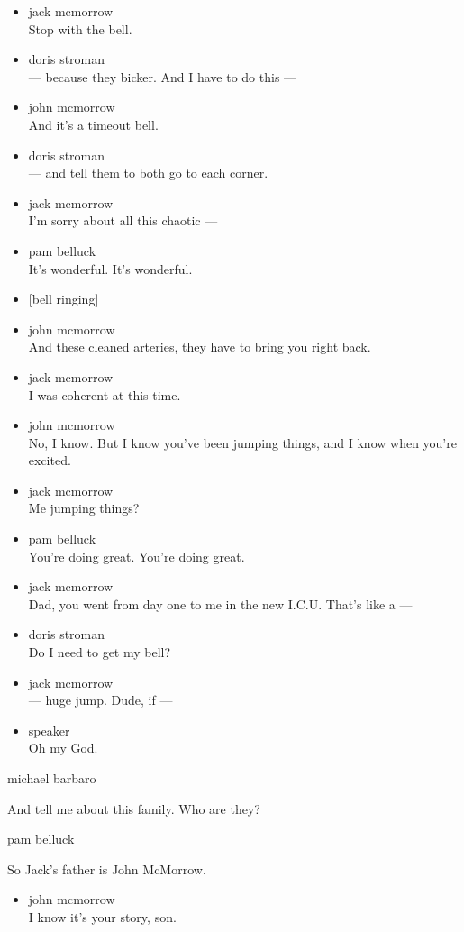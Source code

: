 \begin{itemize}
\item
  jack mcmorrow\\
  Stop with the bell.
\item
  doris stroman\\
  --- because they bicker. And I have to do this ---
\item
  john mcmorrow\\
  And it's a timeout bell.
\item
  doris stroman\\
  --- and tell them to both go to each corner.
\item
  jack mcmorrow\\
  I'm sorry about all this chaotic ---
\item
  pam belluck\\
  It's wonderful. It's wonderful.
\item
  {[}bell ringing{]}
\item
  john mcmorrow\\
  And these cleaned arteries, they have to bring you right back.
\item
  jack mcmorrow\\
  I was coherent at this time.
\item
  john mcmorrow\\
  No, I know. But I know you've been jumping things, and I know when
  you're excited.
\item
  jack mcmorrow\\
  Me jumping things?
\item
  pam belluck\\
  You're doing great. You're doing great.
\item
  jack mcmorrow\\
  Dad, you went from day one to me in the new I.C.U. That's like a ---
\item
  doris stroman\\
  Do I need to get my bell?
\item
  jack mcmorrow\\
  --- huge jump. Dude, if ---
\item
  speaker\\
  Oh my God.
\end{itemize}

michael barbaro

And tell me about this family. Who are they?

pam belluck

So Jack's father is John McMorrow.

\begin{itemize}
\tightlist
\item
  john mcmorrow\\
  I know it's your story, son.
\end{itemize}

